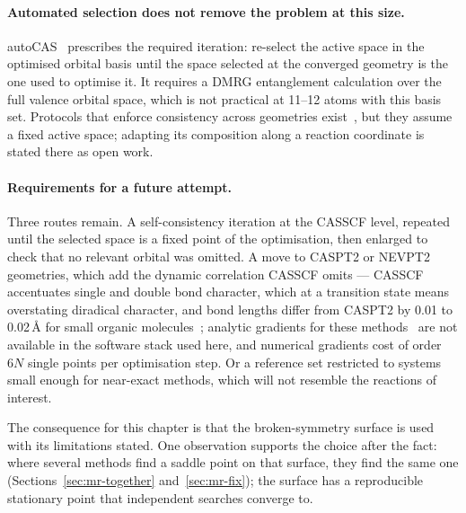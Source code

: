 
\medskip
\paragraph{Automated selection does not remove the problem at this size.}
autoCAS~\cite{stein2019autocas} prescribes the required iteration: re-select the
active space in the optimised orbital basis until the space selected at the
converged geometry is the one used to optimise it. It requires a DMRG
entanglement calculation over the full valence orbital space, which is not
practical at 11--12 atoms with this basis set. Protocols that enforce
consistency across geometries exist~\cite{seal2025wasp, bensberg2023}, but they
assume a fixed active space; adapting its composition along a reaction
coordinate is stated there as open work.

\paragraph{Requirements for a future attempt.} Three routes remain. A
self-consistency iteration at the CASSCF level, repeated until the selected
space is a fixed point of the optimisation, then enlarged to check that no
relevant orbital was omitted. A move to CASPT2 or NEVPT2 geometries, which add
the dynamic correlation CASSCF omits --- CASSCF accentuates single and double
bond character, which at a transition state means overstating diradical
character, and bond lengths differ from CASPT2 by 0.01 to 0.02\,\AA{} for small
organic molecules~\cite{page2003}; analytic gradients for these
methods~\cite{park2019} are not available in the software stack used here, and
numerical gradients cost of order $6N$ single points per optimisation step. Or a
reference set restricted to systems small enough for near-exact methods, which
will not resemble the reactions of interest.

The consequence for this chapter is that the broken-symmetry surface is used
with its limitations stated. One observation supports the choice after the fact:
where several methods find a saddle point on that surface, they find the same
one (Sections~\ref{sec:mr-together} and~\ref{sec:mr-fix}); the surface has a
reproducible stationary point that independent searches converge to.
